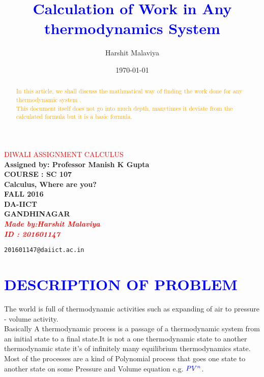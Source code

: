 \documentclass[12pt]{article}
\begin{document}
\title{\textcolor{blue}{Calculation of Work in Any thermodynamics System}}

\begin{center}
\huge
 { \textcolor{red}{ 
{ DIWALI  ASSIGNMENT CALCULUS }       \\
 }
}
\vspace{2 cm}
\huge\bf
{Assigned by: Professor Manish K Gupta  \\
  COURSE      : SC 107   \\
 Calculus, Where are you?\\
  FALL 2016 \\
  DA-IICT      \\
  GANDHINAGAR  \\
}
\vspace{5 cm}
\LARGE {\it \textcolor{red}{
  Made by:Harshit Malaviya   \\
  ID  : 201601147 \\
}
}
\end{center}
\author{
        Harshit Malaviya\\
        }
         
         \texttt{201601147@daiict.ac.in}
\date{\today}

\maketitle

\begin{abstract}
\textcolor{orange}
{\large{
In this article, we shall discuss  the mathmatical way of finding the work done for any thermodynamic system
 .
\\   This document itself does not go into much depth, manytimes it deviate from the calculated formula but it is a basic formula. }}
\end{abstract}


\newpage
\large
\section{\textcolor{blue}{DESCRIPTION OF PROBLEM}}
\textsf
 The world is full of thermodynamic activities such as expanding of air to pressure - volume activity.\\Basically A thermodynamic process is a passage of a thermodynamic system from an initial state to a final state.It is not a one thermodynamic state to another thermodynamic state it's of infinitely many equilibrium thermodynamics state.\\Most of the processes are a kind of Polynomial process that goes one state to another state on some Pressure and Volume equation e.g. $\textcolor{blue}{ PV^n }$.
                                                                               
\end{document}
